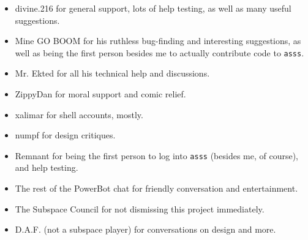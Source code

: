 \documentclass{article}
\newcommand{\asss}{\texttt{asss}}
\begin{document}
\begin{itemize}

\item{divine.216} for general support, lots of help testing, as well as
many useful suggestions.

\item{Mine GO BOOM} for his ruthless bug-finding and interesting
suggestions, as well as being the first %
person besides me to actually contribute code to \asss{}.

\item{Mr. Ekted} for all his technical help and discussions.

\item{ZippyDan} for moral support and comic relief.

\item{xalimar} for shell accounts, mostly.

\item{numpf} for design critiques. %

\item{Remnant} for being the first person to log into \asss{} (besides
me, of course), and help testing.

\item{The rest of the PowerBot chat} for friendly conversation and
entertainment.

\item{The Subspace Council} for not dismissing this project immediately.


\item{D.A.F. (not a subspace player)} for conversations on design and
more.

\end{itemize}
\end{document}
